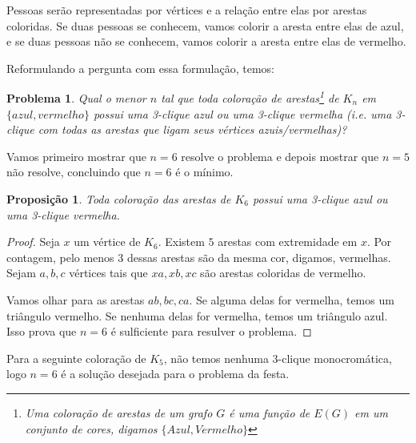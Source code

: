 \documentclass[a4paper]{book}
\newtheorem{prop}{Proposição}
\newtheorem{problem}{Problema}
\begin{document}
Pessoas serão representadas por vértices e a relação entre elas por arestas coloridas. Se duas pessoas se conhecem, vamos colorir a aresta entre elas de azul, e se duas pessoas não se conhecem, vamos colorir a aresta entre elas de vermelho.

Reformulando a pergunta com essa formulação, temos:

\begin{problem}
    Qual o menor $n$ tal que toda coloração de arestas\footnote{Uma coloração de arestas de um grafo $G$ é uma função de $E(G)$ em um conjunto de cores, digamos $\{Azul, Vermelho\}$} de $K_n$ em $\{azul, vermelho\}$ possui uma 3-clique azul ou uma 3-clique vermelha (i.e. uma 3-clique com todas as arestas que ligam seus vértices azuis/vermelhas)?
\end{problem}

Vamos primeiro mostrar que $n=6$ resolve o problema e depois mostrar que $n=5$ não resolve, concluindo que $n=6$ é o mínimo.

\begin{prop}
    Toda coloração das arestas de $K_6$ possui uma 3-clique azul ou uma 3-clique vermelha.
\end{prop}
\begin{proof}
    Seja $x$ um vértice de $K_6$. Existem $5$ arestas com extremidade em $x$. Por contagem, pelo menos $3$ dessas arestas são da mesma cor, digamos, vermelhas. Sejam $a,b,c$ vértices tais que $xa,xb,xc$ são arestas coloridas de vermelho.

    Vamos olhar para as arestas $ab,bc,ca$. Se alguma delas for vermelha, temos um triângulo vermelho. Se nenhuma delas for vermelha, temos um triângulo azul. Isso prova que $n=6$ é sulficiente para resulver o problema.
\end{proof}

Para a seguinte coloração de $K_5$, não temos nenhuma 3-clique monocromática, logo $n=6$ é a solução desejada para o problema da festa.
\begin{center}
\end{center}
\end{document}
